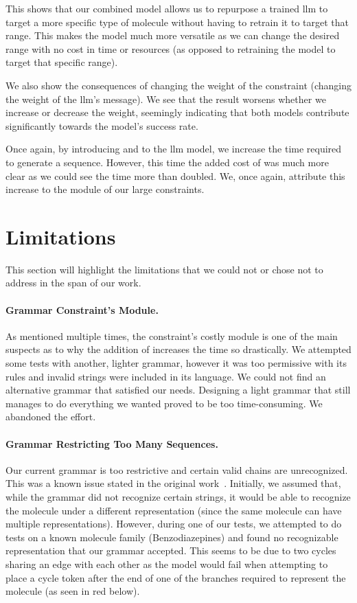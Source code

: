 \documentclass[../Document.tex]{subfiles}
\begin{document}
This shows that our combined model allows us to repurpose a trained \gls{llm} to target a more specific type of molecule without having to retrain it to target that range.
This makes the model much more versatile as we can change the desired range with no cost in time or resources (as opposed to retraining the model to target that specific range).

We also show the consequences of changing the weight of the \oracle constraint (\ie changing the weight of the \gls{llm}'s message).
We see that the result worsens whether we increase or decrease the weight, seemingly indicating that both models contribute significantly towards the model's success rate.

Once again, by introducing \cp and \cpbp to the \gls{llm} model, we increase the time required to generate a sequence.
However, this time the added cost of \bp was much more clear as we could see the time more than doubled. We, once again, attribute this increase to the \bp module of our large constraints.


\section{Limitations}
\label{sec:conc/limitations}
This section will highlight the limitations that we could not or chose not to address in the span of our work.

\paragraph{Grammar Constraint's \bp Module.}
As mentioned multiple times, the \grammar constraint's costly \bp module is one of the main suspects as to why the addition of \bp increases the time so drastically.
We attempted some tests with another, lighter grammar, however it was too permissive with its rules and invalid \smiles strings were included in its language.
We could not find an alternative grammar that satisfied our needs.
Designing a light grammar that still manages to do everything we wanted proved to be too time-consuming. We abandoned the effort. 


\paragraph{Grammar Restricting Too Many Sequences.}
Our current grammar is too restrictive and certain valid \smiles chains are unrecognized. 
This was a known issue stated in the original work~\cite{kraev2018grammars}. 
Initially, we assumed that, while the grammar did not recognize certain \smiles strings, it would be able to recognize the molecule under a different \smiles representation (since the same molecule can have multiple representations).
However, during one of our tests, we attempted to do tests on a known molecule family (Benzodiazepines) and found no recognizable \smiles representation that our grammar accepted.
This seems to be due to two cycles sharing an edge with each other as the model would fail when attempting to place a cycle token after the end of one of the branches required to represent the molecule (as seen in red below).
\end{document}
